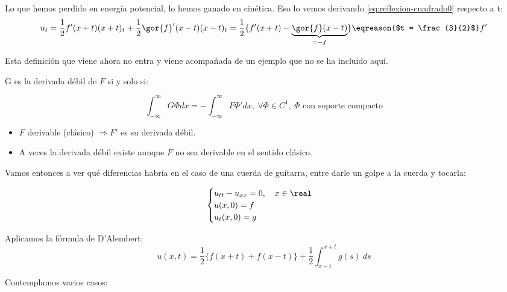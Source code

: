 			Lo que hemos perdido en energía potencial, lo hemos ganado en cinética. Eso lo vemos derivando \ref{eq:reflexion-cuadrado0} respecto a t:
			\[ u_t = \frac{1}{2} f'(x+t) (x+t)_t + \frac{1}{2} \gor{f}' (x-t)(x-t)_t = \frac{1}{2} \{ f'(x+t) - \underbrace{\gor{f} (x-t)}_{=-f} \} \eqreason{$t = \frac{3}{2}$} f'  \]


			\obs Esta definición que viene ahora no entra y viene acompañada de un ejemplo que no se ha incluido aquí.

			\clearpage %
			\begin{defn}

				G es la derivada débil de $F$ si y solo si:

				\[ \int_{-\infty}^\infty G\Phi dx = -\int_{-\infty}^\infty F \Phi' dx, \ \forall \Phi \in C^1, \ \Phi \text{ con soporte compacto} \]

				\begin{itemize}
					\item $F$ derivable (clásico) $\Rightarrow F'$ es su derivada débil.
					\item A veces la derivada débil existe aunque $F$ no sea derivable en el sentido clásico.

				\end{itemize}
			\end{defn}

			Vamos entonces a ver qué diferencias habría en el caso de una cuerda de guitarra, entre darle un golpe a la cuerda y tocarla:

			\[\begin{cases}
				u_{tt} -u_{xx} =0, \quad x \in \real \\
				u(x,0) = f \\
				u_t(x,0) = g
			\end{cases}\]

			Aplicamos la fórmula de D'Alembert: 
			\[ u(x,t) = \frac{1}{2} \{ f(x+t) + f(x-t) \} + \frac{1}{2} \int_{x-t}^{x+t} g(s) \ ds \]

			Contemplamos varios casos:

			\begin{figure}[hbtp]
				\begin{minipage}[m]{.5\linewidth}
				\end{minipage}
				\begin{minipage}[m]{.5\linewidth}
				\end{minipage}
			\end{figure}



